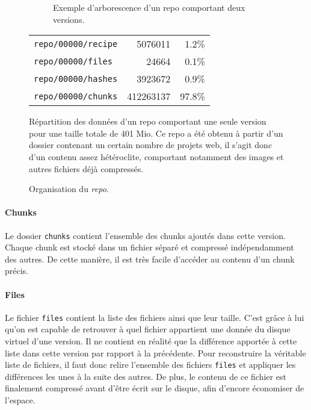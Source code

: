 \documentclass[a4paper]{report}
\begin{document}
\begin{figure*}[ht]
\centering

\begin{subfigure}[c]{.34\textwidth}
  \caption{Exemple d'arborescence d'un repo comportant deux versions.}
  \label{fig:repo-dir-tree}
\end{subfigure}
\hfill
\begin{subtable}[c]{.55\textwidth}
  \centering
  \begin{tabular}{l r r}
  \verb|repo/00000/recipe| &   5076011 &   1.2\% \\
  \verb|repo/00000/files| &      24664 &   0.1\% \\
  \verb|repo/00000/hashes| &   3923672 &   0.9\% \\
  \verb|repo/00000/chunks| & 412263137 &  97.8\% \\
  \end{tabular}
  \caption{
    Répartition des données d'un repo comportant une seule version pour une taille totale de 401 Mio.
    Ce repo a été obtenu à partir d'un dossier contenant un certain nombre de projets web,
    il s'agit donc d'un contenu assez hétéroclite, comportant notamment des images et autres fichiers déjà compressés.
  }
  \label{tab:repo-data-distribution}
\end{subtable}

\caption{Organisation du \emph{repo}.}
\label{fig:repo-organisation}
\end{figure*}

\paragraph{Chunks}
Le dossier \verb|chunks| contient l'ensemble des chunks ajoutés dans cette version.
Chaque chunk est stocké dans un fichier séparé et compressé indépendamment des autres.
De cette manière, il est très facile d'accéder au contenu d'un chunk précis.

\paragraph{Files}
Le fichier \verb|files| contient la liste des fichiers ainsi que leur taille.
C'est grâce à lui qu'on est capable de retrouver
à quel fichier appartient une donnée du disque virtuel d'une version.
Il ne contient en réalité que la différence apportée à cette liste dans cette version
par rapport à la précédente.
Pour reconstruire la véritable liste de fichiers,
il faut donc relire l'ensemble des fichiers \verb|files|
et appliquer les différences les unes à la suite des autres.
De plus, le contenu de ce fichier est finalement compressé avant d'être écrit sur le disque,
afin d'encore économiser de l'espace.
\end{document}

